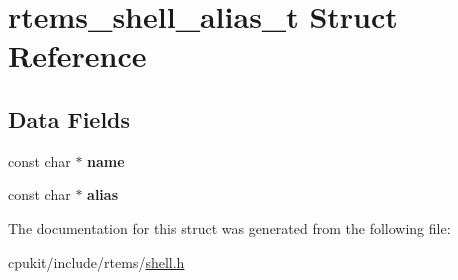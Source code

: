 \hypertarget{structrtems__shell__alias__t}{}\section{rtems\+\_\+shell\+\_\+alias\+\_\+t Struct Reference}
\label{structrtems__shell__alias__t}
\subsection*{Data Fields}
\begin{DoxyCompactItemize}
\item 
\mbox{\label{structrtems__shell__alias__t_ae8d2e5e12b09d96017e7b0fb0edd0867}} 
const char $\ast$ {\bfseries name}
\item 
\mbox{\label{structrtems__shell__alias__t_ab25ecb1f51eeeb78293490ed5c58fc72}} 
const char $\ast$ {\bfseries alias}
\end{DoxyCompactItemize}


The documentation for this struct was generated from the following file\+:\begin{DoxyCompactItemize}
\item 
cpukit/include/rtems/\mbox{\hyperlink{shell_8h}{shell.\+h}}\end{DoxyCompactItemize}
